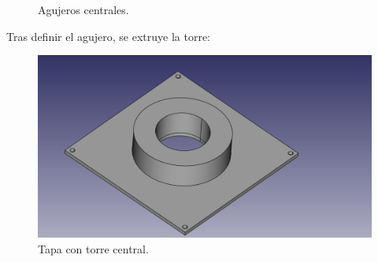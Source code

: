 \begin{figure}[H]
    \centering
    \caption{Agujeros centrales.}
    \label{fig:agujeros_central_tapa_superior}
\end{figure}

Tras definir el agujero, se extruye la torre:

\begin{figure}[H]
    \centering
    \includegraphics[width=.9\linewidth]{pictures/TorreCentral.png}
    \caption{Tapa con torre central.}
    \label{fig:torre_central_tapa_superior}
\end{figure}


